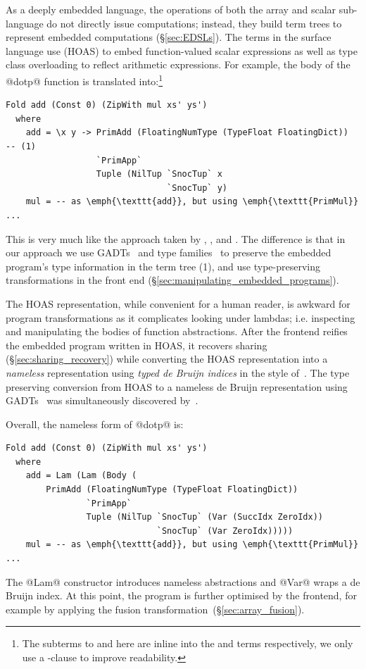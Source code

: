 As a deeply embedded language, the operations of both the array and scalar
sub-language do not directly issue computations; instead, they build term trees
to represent embedded computations (\S\ref{sec:EDSLs}). The terms in the surface
language use  (HOAS) to embed
function-valued scalar expressions as well as type class overloading to reflect
arithmetic expressions. For example, the body of the @dotp@ function
is translated into:\footnote{The subterms to  and 
here are inline into the  and  terms respectively,
we only use a -clause to improve readability.}
%
\begin{lstlisting}[style=haskell]
Fold add (Const 0) (ZipWith mul xs' ys')
  where
    add = \x y -> PrimAdd (FloatingNumType (TypeFloat FloatingDict))               -- (1)
                  `PrimApp`
                  Tuple (NilTup `SnocTup` x
                                `SnocTup` y)
    mul = -- as \emph{\texttt{add}}, but using \emph{\texttt{PrimMul}} ...
\end{lstlisting}
%
This is very much like the approach taken by \citet{Elliott:2004hh},
\citet{Gill:2011wy}, and \citet{Mainland:2010vj}. The difference is that in our
approach we use GADTs~\cite{Jones:2006eh} and type
families~\cite{Chakravarty:2005dx,Schrijvers:2008ir} to preserve the embedded
program's type information in the term tree (1), and use type-preserving
transformations in the front end (\S\ref{sec:manipulating_embedded_programs}).

The HOAS representation, while convenient for a human reader, is awkward
for program transformations as it complicates looking under lambdas; i.e.
inspecting and manipulating the bodies of function abstractions. After the
frontend reifies the embedded program written in HOAS, it recovers sharing
(\S\ref{sec:sharing_recovery}) while converting the HOAS representation into a
\emph{nameless} representation using \emph{typed de Bruijn indices} in the style of~\citet{Altenkirch:2003kz}. The type preserving
conversion from HOAS to a nameless de Bruijn representation using
GADTs~\cite{Chakravarty:2009uo} was simultaneously discovered
by~\citet{Atkey:2009dj}.

Overall, the nameless form of @dotp@ is:
%
\begin{lstlisting}[style=haskell]
Fold add (Const 0) (ZipWith mul xs' ys')
  where
    add = Lam (Lam (Body (
        PrimAdd (FloatingNumType (TypeFloat FloatingDict))
                `PrimApp`
                Tuple (NilTup `SnocTup` (Var (SuccIdx ZeroIdx))
                              `SnocTup` (Var ZeroIdx)))))
    mul = -- as \emph{\texttt{add}}, but using \emph{\texttt{PrimMul}} ...
\end{lstlisting}
%
The @Lam@ constructor introduces nameless abstractions and @Var@ wraps a de
Bruijn index. At this point, the program is further optimised by the frontend,
for example by applying the fusion transformation~(\S\ref{sec:array_fusion}).


